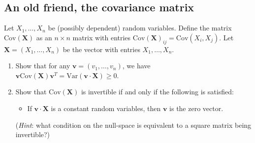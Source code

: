 \documentclass[12pt,reqno]{amsart}
\theoremstyle{definition}
\theoremstyle{remark}
\numberwithin{equation}{section}
\begin{document}
\subsection{An old friend, the covariance matrix}
Let $X_{1},\ldots,X_{n}$ be (possibly dependent) random variables. Define the matrix $\mathrm{Cov}(\mathbf{X})$ as an $n\times n$ matrix with entries $\mathrm{Cov}(\mathbf{X})_{ij}=\mathrm{Cov}(X_{i},X_{j})$. Let $\mathbf{X}=(X_{1},\ldots,X_{n})$ be the vector with entries $X_{1},\ldots,X_{n}$.
\begin{enumerate}
\item Show that for any $\mathbf{v}=(v_{1},\ldots,v_{n})$, we have $\mathbf{v}\mathrm{Cov}(\mathbf{X})\mathbf{v}^{T}=\mathrm{Var}(\mathbf{v}\cdot\mathbf{X})\geq0$. 
\item Show that $\mathrm{Cov}(\mathbf{X})$ is invertible if and only if the following is satisfied:
\begin{itemize}
\item If $\mathbf{v}\cdot\mathbf{X}$ is a constant random variables, then $\mathbf{v}$ is the zero vector.
\end{itemize}
(\emph{Hint}: what condition on the null-space is equivalent to a square matrix being invertible?)
\end{enumerate}
\end{document}
